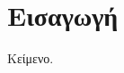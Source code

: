 \documentclass{article}
\begin{document}
\makeatletter{}\makeatother
\section{Εισαγωγή}
Κείμενο.
\end{document}
